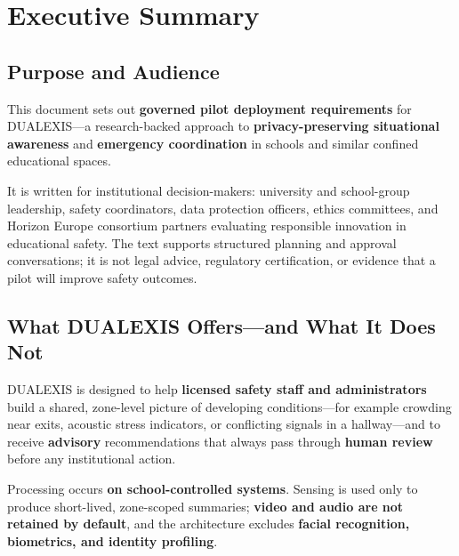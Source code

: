 \section{Executive Summary}
\label{sec:executive-summary}

\subsection{Purpose and Audience}

This document sets out \textbf{governed pilot deployment requirements} for DUALEXIS---a
research-backed approach to \textbf{privacy-preserving situational awareness} and
\textbf{emergency coordination} in schools and similar confined educational spaces.

It is written for institutional decision-makers: university and school-group leadership,
safety coordinators, data protection officers, ethics committees, and Horizon Europe
consortium partners evaluating responsible innovation in educational safety.
The text supports structured planning and approval conversations; it is not legal advice,
regulatory certification, or evidence that a pilot will improve safety outcomes.

\subsection{What DUALEXIS Offers---and What It Does Not}

DUALEXIS is designed to help \textbf{licensed safety staff and administrators} build a
shared, zone-level picture of developing conditions---for example crowding near exits,
acoustic stress indicators, or conflicting signals in a hallway---and to receive
\textbf{advisory} recommendations that always pass through \textbf{human review} before
any institutional action.

Processing occurs \textbf{on school-controlled systems}.
Sensing is used only to produce short-lived, zone-scoped summaries; \textbf{video and
audio are not retained by default}, and the architecture excludes \textbf{facial
recognition, biometrics, and identity profiling}.

